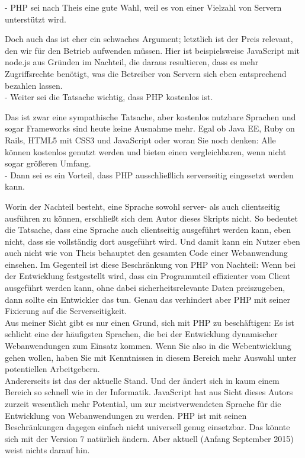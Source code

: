 -	PHP sei nach Theis eine gute Wahl, weil es von einer Vielzahl von Servern unterstützt wird.

Doch auch das ist eher ein schwaches Argument; letztlich ist der Preis relevant, den wir für den Betrieb aufwenden müssen. Hier ist beispielsweise JavaScript mit node.js aus Gründen im Nachteil, die daraus resultieren, dass es mehr Zugriffsrechte benötigt, was die Betreiber von Servern sich eben entsprechend bezahlen lassen.\\


-	Weiter sei die Tatsache wichtig, dass PHP kostenlos ist.

Das ist zwar eine sympathische Tatsache, aber kostenlos nutzbare Sprachen und sogar Frameworks sind heute keine Ausnahme mehr. Egal ob Java EE, Ruby on Rails, HTML5 mit CSS3 und JavaScript oder woran Sie noch denken: Alle können kostenlos genutzt werden und bieten einen vergleichbaren, wenn nicht sogar größeren Umfang.\\


-	Dann sei es ein Vorteil, dass PHP ausschließlich serverseitig eingesetzt werden kann.

Worin der Nachteil besteht, eine Sprache sowohl server- als auch clientseitig ausführen zu können, erschließt sich dem Autor dieses Skripts nicht. So bedeutet die Tatsache, dass eine Sprache auch clientseitig ausgeführt werden kann, eben nicht, dass sie vollständig dort ausgeführt wird. Und damit kann ein Nutzer eben auch nicht wie von Theis behauptet den gesamten Code einer Webanwendung einsehen. Im Gegenteil ist diese Beschränkung von PHP von Nachteil: Wenn bei der Entwicklung festgestellt wird, dass ein Programmteil effizienter vom Client ausgeführt werden kann, ohne dabei sicherheitsrelevante Daten preiszugeben, dann sollte ein Entwickler das tun. Genau das verhindert aber PHP mit seiner Fixierung auf die Serverseitigkeit.\\


Aus meiner Sicht gibt es nur einen Grund, sich mit PHP zu beschäftigen: Es ist schlicht eine der häufigsten Sprachen, die bei der Entwicklung dynamischer Webanwendungen zum Einsatz kommen. Wenn Sie also in die Webentwicklung gehen wollen, haben Sie mit Kenntnissen in diesem Bereich mehr Auswahl unter potentiellen Arbeitgebern.\\


Andererseits ist das der aktuelle Stand. Und der ändert sich in kaum einem Bereich so schnell wie in der Informatik. JavaScript hat aus Sicht dieses Autors zurzeit wesentlich mehr Potential, um zur meistverwendeten Sprache für die Entwicklung von Webanwendungen zu werden. PHP ist mit seinen Beschränkungen dagegen einfach nicht universell genug einsetzbar. Das könnte sich mit der Version 7 natürlich ändern. Aber aktuell (Anfang September 2015) weist nichts darauf hin.

